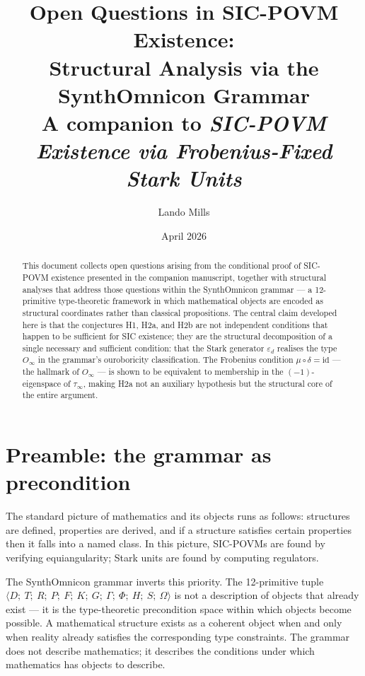 \documentclass[12pt]{article}
\title{%
  \textbf{Open Questions in SIC-POVM Existence:}\\[4pt]
  \textbf{Structural Analysis via the SynthOmnicon Grammar}\\[6pt]
  \large A companion to \emph{SIC-POVM Existence via Frobenius-Fixed Stark Units}
}
\author{Lando Mills}
\date{April 2026}
\theoremstyle{plain}
\theoremstyle{definition}
\theoremstyle{remark}
\newcommand{\tauinf}{\tau_\infty}
\newcommand{\epsd}{\varepsilon_d}
\begin{document}
\maketitle

\begin{abstract}
This document collects open questions arising from the conditional proof of SIC-POVM existence
presented in the companion manuscript, together with structural analyses that address those
questions within the SynthOmnicon grammar — a 12-primitive type-theoretic framework in which
mathematical objects are encoded as structural coordinates rather than classical propositions.
The central claim developed here is that the conjectures H1, H2a, and H2b are not independent
conditions that happen to be sufficient for SIC existence; they are the structural decomposition
of a single necessary and sufficient condition: that the Stark generator $\epsd$ realises the
type $O_\infty$ in the grammar's ouroboricity classification. The Frobenius condition
$\mu \circ \delta = \mathrm{id}$ — the hallmark of $O_\infty$ — is shown to be equivalent to
membership in the $(-1)$-eigenspace of $\tauinf$, making H2a not an auxiliary hypothesis but
the structural core of the entire argument.
\end{abstract}

\tableofcontents
\bigskip

\section{Preamble: the grammar as precondition}
\label{sec:preamble}

The standard picture of mathematics and its objects runs as follows: structures are defined,
properties are derived, and if a structure satisfies certain properties then it falls into a
named class. In this picture, SIC-POVMs are found by verifying equiangularity; Stark units are
found by computing regulators.

The SynthOmnicon grammar inverts this priority. The 12-primitive tuple
$\langle D;\ T;\ R;\ P;\ F;\ K;\ G;\ \Gamma;\ \Phi;\ H;\ S;\ \Omega \rangle$
is not a description of objects that already exist — it is the type-theoretic precondition
space within which objects become possible. A mathematical structure exists as a coherent object
when and only when reality already satisfies the corresponding type constraints. The grammar
does not describe mathematics; it describes the conditions under which mathematics has objects
to describe.
\end{document}
